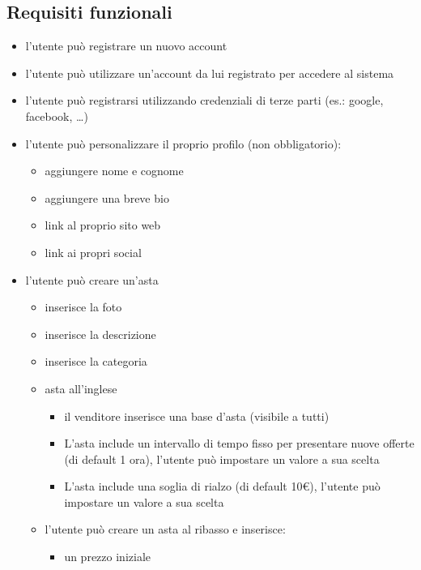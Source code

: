 \subsection{Requisiti funzionali}
\begin{itemize}
	\item l'utente può registrare un nuovo account
	\item l'utente può utilizzare un'account da lui registrato per accedere al sistema
	\item l'utente può registrarsi utilizzando credenziali di terze parti (es.: google, facebook, …)
	\item l'utente può personalizzare il proprio profilo (non obbligatorio):
	      \begin{itemize}[label={\tiny$\blacksquare$}]
		      \renewcommand{\labelitemi}{\tiny$\blacksquare$}
		      \item aggiungere nome e cognome
		      \item aggiungere una breve bio
		      \item link al proprio sito web
		      \item link ai propri social
	      \end{itemize}
	      \medskip
	\item l'utente può creare un'asta
	      \begin{itemize}[label={\tiny$\blacksquare$}]
		      \item inserisce la foto
		      \item inserisce la descrizione
		      \item inserisce la categoria
		      \item asta all'inglese
		            \begin{itemize}[label={\tiny$-$}]
			            \item il venditore inserisce una base d'asta (visibile a tutti)
			            \item L'asta include un intervallo di tempo fisso per presentare nuove offerte (di default 1 ora), l'utente può impostare un valore a sua scelta
			            \item L'asta include una soglia di rialzo (di default 10€), l'utente può impostare un valore a sua scelta
		            \end{itemize}
		      \item l'utente può creare un asta al ribasso e inserisce:
		            \begin{itemize}[label={\tiny$-$}]
			            \item un prezzo iniziale

\end{itemize}
\end{itemize}
\end{itemize}
